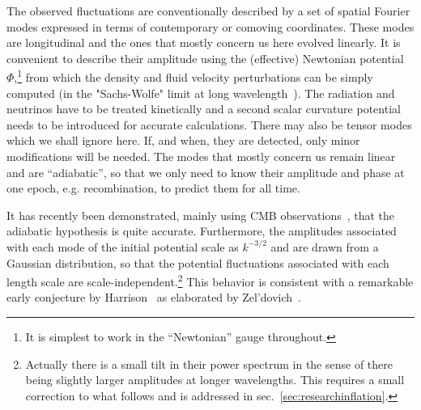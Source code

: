 \documentclass[psfig,11pt]{article}
\begin{document}
The observed fluctuations are conventionally described by a set of spatial Fourier modes expressed in terms of contemporary or comoving coordinates. These modes are longitudinal and the ones that mostly concern us here evolved linearly. It is convenient to describe their amplitude using the (effective) Newtonian potential $\Phi$,\footnote{It is simplest to work in the ``Newtonian'' gauge throughout.} from which the density and fluid velocity perturbations can be simply computed (in the "Sachs-Wolfe" limit at long wavelength~\cite{Sachs1967}). The radiation and neutrinos have to be treated kinetically and a second scalar curvature potential needs to be introduced for accurate calculations. There may also be tensor modes which we shall ignore here. If, and when, they are detected, only minor modifications will be needed. The modes that mostly concern us remain linear and are ``adiabatic'', so that we only need to know their amplitude and phase at one epoch, e.g. recombination, to predict them for all time.

It has recently been demonstrated, mainly using CMB observations~\cite{Planck2015cosmopara}, that the adiabatic hypothesis is quite accurate. Furthermore, the amplitudes associated with each mode of the initial potential scale as $k^{-3/2}$ and are drawn from a Gaussian distribution, so that the potential fluctuations associated with each length scale are scale-independent.\footnote{Actually there is a small tilt in their power spectrum in the sense of there being slightly larger amplitudes at longer wavelengths. This requires a small correction to what follows and is addressed in sec.~\ref{sec:researchinflation}.} This behavior is consistent with a remarkable early conjecture by Harrison~\cite{Harrison1970} as elaborated by Zel'dovich~\cite{Zeldovich1972}. 
\end{document}
